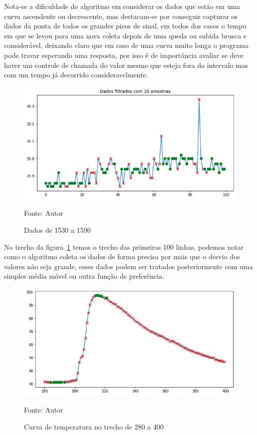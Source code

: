 Nota-se a dificuldade do algoritmo em considerar os dados que estão em uma curva ascendente ou decrescente, mas destacam-se por conseguir capturar os dados da ponta de todos os grandes picos de sinal, em todos dos casos o tempo em que se levou para uma nova coleta depois de uma queda ou subida brusca e considerável, deixando claro que em caso de uma curva muito longa o programa pode travar esperando uma resposta, por isso é de importância avaliar se deve haver um controle de chamada do valor mesmo que esteja fora do intervalo mas com um tempo já decorrido consideravelmente.


\begin{figure}[H]
	\centering
	\includegraphics[width=15cm]{imagens/sensores/filtrado_100_ultimas.png}
	\caption{Dados de 1530 a 1590}
	Fonte: Autor
	\label{fig: indice}
\end{figure}

No trecho da figura~\ref{fig: indice} temos o trecho das primeiras 100 linhas, podemos notar como o algoritmo coleta os dados de forma precisa por mais que o desvio dos valores não seja grande, esses dados podem ser tratados posteriormente com uma simples média móvel ou outra função de preferência.


\begin{figure}[H]
	\centering
	\includegraphics[width=15cm]{imagens/sensores/indice2.png}
	\caption{Curva de temperatura no trecho de 280 a 400}
	Fonte: Autor
	\label{fig: indice2}
\end{figure}

